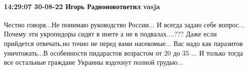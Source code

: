  
 
 
 
 

\paragraph{14:29:07 30-08-22 Игорь Радионовответил vasja}

Честно говоря...Не понимаю руководство России...
И всегда задаю себе вопрос...
Почему эти укропидоры сидят в инете а не в подвалах....???
Даже если прийдется отвечать,но точно не перед вами насекомые...
Вас надо как паразитов уничтожать...В особенности пидарастов возрастом от 20 до 35 ...
И только тогда все остальные граждане Украины вздохнут полной грудью...
